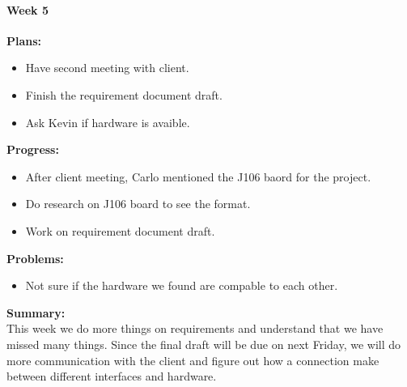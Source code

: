 \paragraph{Week 5}
\begin{adjustwidth}{2.5em}{0pt}
    \vspace{-0.5cm}\textbf{Plans:}
    \vspace{-0.5cm}
    \begin{itemize}
        \item Have second meeting with client.
        \item Finish the requirement document draft.
        \item Ask Kevin if hardware is avaible.
    \end{itemize} 
    \vspace{-0.3cm}\textbf{Progress:}
    \vspace{-0.5cm}
    \begin{itemize}
        \item After client meeting, Carlo mentioned the J106 baord for the project.
        \item Do research on J106 board to see the format.
        \item Work on requirement document draft.
    \end{itemize} 
    \vspace{-0.3cm}\textbf{Problems:}
    \vspace{-0.5cm}
    \begin{itemize}
        \item Not sure if the hardware we found are compable to each other.
    \end{itemize}  
    \vspace{-0.3cm}\noindent\textbf{Summary:}\\
    \noindent This week we do more things on requirements and understand that we have missed many things. 
    Since the final draft will be due on next Friday, we will do more communication with the client and 
    figure out how a connection make between different interfaces and hardware. \\
\end{adjustwidth} 

